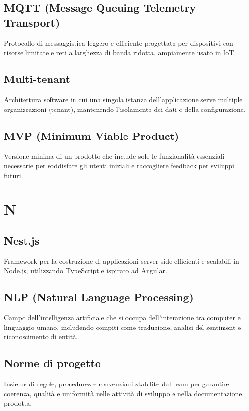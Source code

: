 \documentclass[a4paper,11pt]{article}
\begin{document}
\subsection{MQTT (Message Queuing Telemetry Transport)}
Protocollo di messaggistica leggero e efficiente progettato per dispositivi con risorse limitate e reti a larghezza di banda ridotta, ampiamente usato in IoT.

\subsection{Multi-tenant}
Architettura software in cui una singola istanza dell'applicazione serve multiple organizzazioni (tenant), mantenendo l'isolamento dei dati e della configurazione.

\subsection{MVP (Minimum Viable Product)}
Versione minima di un prodotto che include solo le funzionalità essenziali necessarie per soddisfare gli utenti iniziali e raccogliere feedback per sviluppi futuri.

\newpage
\section{N}

\subsection{Nest.js}
Framework per la costruzione di applicazioni server-side efficienti e scalabili in Node.js, utilizzando TypeScript e ispirato ad Angular.

\subsection{NLP (Natural Language Processing)}
Campo dell'intelligenza artificiale che si occupa dell'interazione tra computer e linguaggio umano, includendo compiti come traduzione, analisi del sentiment e riconoscimento di entità.

\subsection{Norme di progetto}
Insieme di regole, procedures e convenzioni stabilite dal team per garantire coerenza, qualità e uniformità nelle attività di sviluppo e nella documentazione prodotta.
\end{document}
